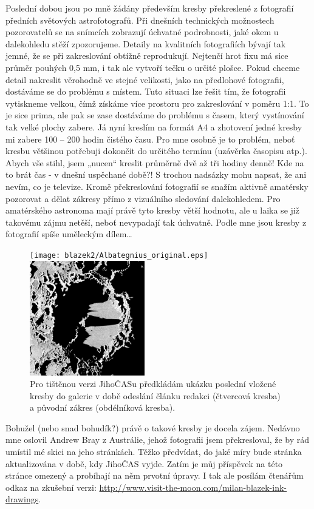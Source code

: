 \documentclass[10pt,a5paper,twoside]{book}
\begin{document}
Poslední dobou jsou po mně žádány především kresby překreslené z fotografií předních světových astrofotografů. Při dnešních technických možnostech pozorovatelů se na snímcích zobrazují úchvatné podrobnosti, jaké okem u dalekohledu stěží zpozorujeme. Detaily na kvalitních fotografiích bývají tak jemné, že se při zakreslování obtížně reprodukují. Nejtenčí hrot fixu má sice průměr pouhých 0,5 mm, i tak ale vytvoří tečku o určité plošce. Pokud chceme detail nakreslit věrohodně ve stejné velikosti, jako na předlohové fotografii, dostáváme se do problému s místem. Tuto situaci lze řešit tím, že fotografii vytiskneme velkou, čímž získáme více prostoru pro zakreslování v poměru 1:1. To je sice prima, ale pak se zase dostáváme do problému s časem, který vystínování tak velké plochy zabere. Já nyní kreslím na formát A4 a zhotovení jedné kresby mi zabere 100 – 200 hodin čistého času. Pro mne osobně je to problém, neboť kresbu většinou potřebuji dokončit do určitého termínu (uzávěrka časopisu atp.). Abych vše stihl, jsem „nucen“ kreslit průměrně dvě až tři hodiny denně! Kde na to brát čas - v dnešní uspěchané době?! S trochou nadsázky mohu napsat, že ani nevím, co je televize. Kromě překreslování fotografií se snažím aktivně amatérsky pozorovat a dělat zákresy přímo z vizuálního sledování dalekohledem. Pro amatérského astronoma mají právě tyto kresby větší hodnotu, ale u laika se již takovému zájmu netěší, neboť nevypadají tak úchvatně. Podle mne jsou kresby z fotografií spíše uměleckým dílem… 
\begin{figure}[htbp]
\centering
\texttt{[image: blazek2/Albategnius\_original.eps]}
\includegraphics[width=5cm]{blazek2/Albategnius_z_galerie.eps}\\
Pro tištěnou verzi JihoČASu předkládám ukázku poslední vložené kresby do galerie v době odeslání článku redakci (čtvercová kresba) a původní zákres (obdélníková kresba).
\end{figure} 

Bohužel (nebo snad bohudík?) právě o takové kresby je docela zájem. Nedávno mne oslovil Andrew Bray z Austrálie, jehož fotografii jsem překresloval, že by rád umístil mé skici na jeho stránkách. Těžko předvídat, do jaké míry bude stránka aktualizována v době, kdy JihoČAS vyjde. Zatím je můj příspěvek na této stránce omezený a probíhají na něm prvotní úpravy. I tak ale posílám čtenářům odkaz na zkušební verzi: \url{http://www.visit-the-moon.com/milan-blazek-ink-drawings}.
\end{document}
